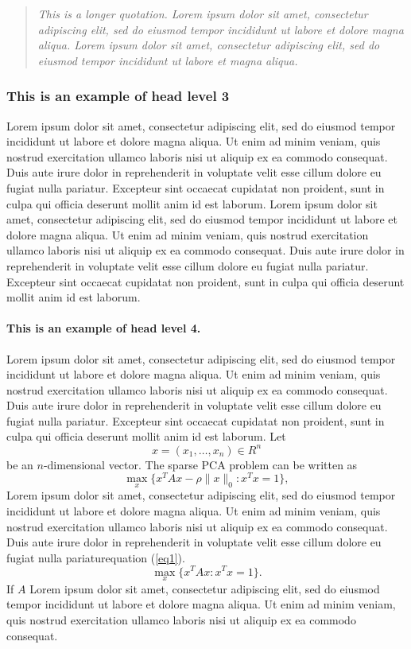 \documentclass{sbc2023}%
\begin{document}
\begin{quotation}
\textit{This is a longer quotation. Lorem ipsum dolor sit amet, consectetur adipiscing elit, sed do eiusmod tempor incididunt ut labore et dolore magna aliqua. Lorem ipsum dolor sit amet, consectetur adipiscing elit, sed do eiusmod tempor incididunt ut labore et magna aliqua. 
}\end{quotation} 

\subsubsection{This is an example of head level 3}
Lorem ipsum dolor sit amet, consectetur adipiscing elit, sed do eiusmod tempor incididunt ut labore et dolore magna aliqua. Ut enim ad minim veniam, quis nostrud exercitation ullamco laboris nisi ut aliquip ex ea commodo consequat. Duis aute irure dolor in reprehenderit in voluptate velit esse cillum dolore eu fugiat nulla pariatur. Excepteur sint occaecat cupidatat non proident, sunt in culpa qui officia deserunt mollit anim id est laborum. Lorem ipsum dolor sit amet, consectetur adipiscing elit, sed do eiusmod tempor incididunt ut labore et dolore magna aliqua. Ut enim ad minim veniam, quis nostrud exercitation ullamco laboris nisi ut aliquip ex ea commodo consequat. Duis aute irure dolor in reprehenderit in voluptate velit esse cillum dolore eu fugiat nulla pariatur. Excepteur sint occaecat cupidatat non proident, sunt in culpa qui officia deserunt mollit anim id est laborum.

\paragraph{This is an example of head level 4.}
Lorem ipsum dolor sit amet, consectetur adipiscing elit, sed do eiusmod tempor incididunt ut labore et dolore magna aliqua. Ut enim ad minim veniam, quis nostrud exercitation ullamco laboris nisi ut aliquip ex ea commodo consequat. Duis aute irure dolor in reprehenderit in voluptate velit esse cillum dolore eu fugiat nulla pariatur. Excepteur sint occaecat cupidatat non proident, sunt in culpa qui officia deserunt mollit anim id est laborum. 
Let
\[
x=(x_1,\dots,x_n)\in R^n
\]be an \(n\)-dimensional vector. The sparse PCA problem can be written as
\begin{equation}\label{eq1}
\max\limits_{x}\{x^TAx-\rho\|x\|_0:x^Tx=1\},
\end{equation}
Lorem ipsum dolor sit amet, consectetur adipiscing elit, sed do eiusmod tempor incididunt ut labore et dolore magna aliqua. Ut enim ad minim veniam, quis nostrud exercitation ullamco laboris nisi ut aliquip ex ea commodo consequat. Duis aute irure dolor in reprehenderit in voluptate velit esse cillum dolore eu fugiat nulla pariatur\break equation (\ref{eq1}). 
\[\max\limits_{x}\{x^TAx :x^Tx=1\}.\]
If $A$ Lorem ipsum dolor sit amet, consectetur adipiscing elit, sed do eiusmod tempor incididunt ut labore et dolore magna aliqua. Ut enim ad minim veniam, quis nostrud exercitation ullamco laboris nisi ut aliquip ex ea commodo consequat. 
\end{document}
